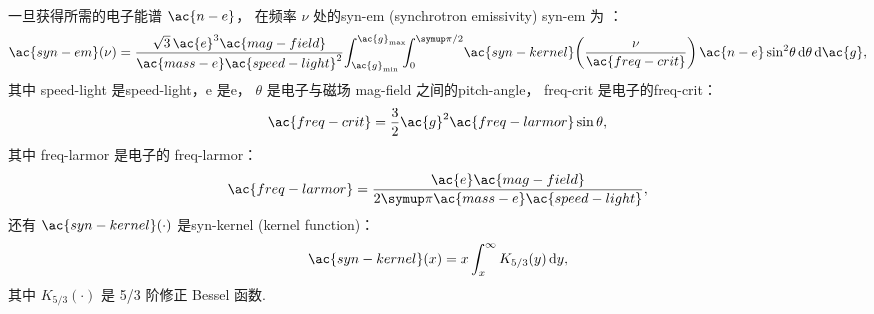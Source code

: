 一旦获得所需的电子能谱 $\ac{n-e}$，
在频率 $\nu$ 处的\acl{syn-em} (synchrotron emissivity)
\ac{syn-em} 为 \cite{rybicki1979}：
\begin{equation}
  \label{sec:jnu-sync}
  \ac{syn-em}(\nu) =
    \frac{\sqrt{3} \,\ac{e}^3 \ac{mag-field}}{\ac{mass-e}\ac{speed-light}^2}
    \!\int_{\ac{g}_{\R{min}}}^{\ac{g}_{\R{max}}}
    \!\!\!\int_0^{\Cpi/2}
    \! \ac{syn-kernel}\!\left( \frac{\nu}{\ac{freq-crit}} \right)
    \ac{n-e} \sin^2 \!\theta \,\D{\theta} \,\D{\ac{g}} ,
\end{equation}
其中
\ac{speed-light} 是\acl{speed-light}，\ac{e} 是\acl{e}，
$\theta$ 是电子与磁场 \ac{mag-field} 之间的\ac{pitch-angle}，
\ac{freq-crit} 是电子的\acl{freq-crit}：
\begin{equation}
  \ac{freq-crit} = \frac{3}{2} \ac{g}^2 \ac{freq-larmor} \sin\theta ,
\end{equation}
其中 \ac{freq-larmor} 是电子的 \acl{freq-larmor}：
\begin{equation}
  \ac{freq-larmor} =
    \frac{\ac{e}\ac{mag-field}}{2\Cpi \ac{mass-e}\ac{speed-light}} ,
\end{equation}
还有 $\ac{syn-kernel}(\cdot)$ 是\acl{syn-kernel} (kernel function)：
\begin{equation}
  \ac{syn-kernel}(x) = x \int_x^{\infty} K_{5/3}(y) \,\D{y} ,
\end{equation}
其中 $K_{5/3}(\cdot)$ 是 5/3 阶修正 Bessel 函数.

